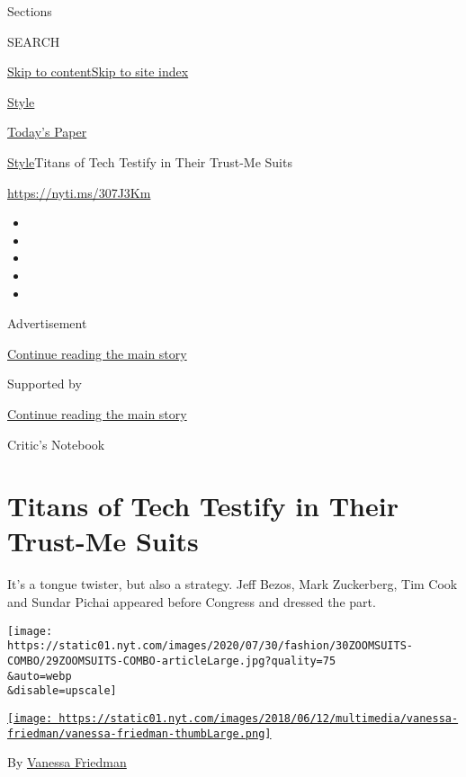 Sections

SEARCH

\protect\hyperlink{site-content}{Skip to
content}\protect\hyperlink{site-index}{Skip to site index}

\href{https://www.nytimes.com/section/style}{Style}

\href{https://myaccount.nytimes.com/auth/login?response_type=cookie\&client_id=vi}{}

\href{https://www.nytimes.com/section/todayspaper}{Today's Paper}

\href{/section/style}{Style}\textbar{}Titans of Tech Testify in Their
Trust-Me Suits

\url{https://nyti.ms/307J3Km}

\begin{itemize}
\item
\item
\item
\item
\item
\end{itemize}

Advertisement

\protect\hyperlink{after-top}{Continue reading the main story}

Supported by

\protect\hyperlink{after-sponsor}{Continue reading the main story}

Critic's Notebook

\hypertarget{titans-of-tech-testify-in-their-trust-me-suits}{%
\section{Titans of Tech Testify in Their Trust-Me
Suits}\label{titans-of-tech-testify-in-their-trust-me-suits}}

It's a tongue twister, but also a strategy. Jeff Bezos, Mark Zuckerberg,
Tim Cook and Sundar Pichai appeared before Congress and dressed the
part.

\texttt{[image: https://static01.nyt.com/images/2020/07/30/fashion/30ZOOMSUITS-COMBO/29ZOOMSUITS-COMBO-articleLarge.jpg?quality=75\\\&auto=webp\\\&disable=upscale]}

\href{https://www.nytimes.com/by/vanessa-friedman}{\texttt{[image: https://static01.nyt.com/images/2018/06/12/multimedia/vanessa-friedman/vanessa-friedman-thumbLarge.png]}}

By \href{https://www.nytimes.com/by/vanessa-friedman}{Vanessa Friedman}

